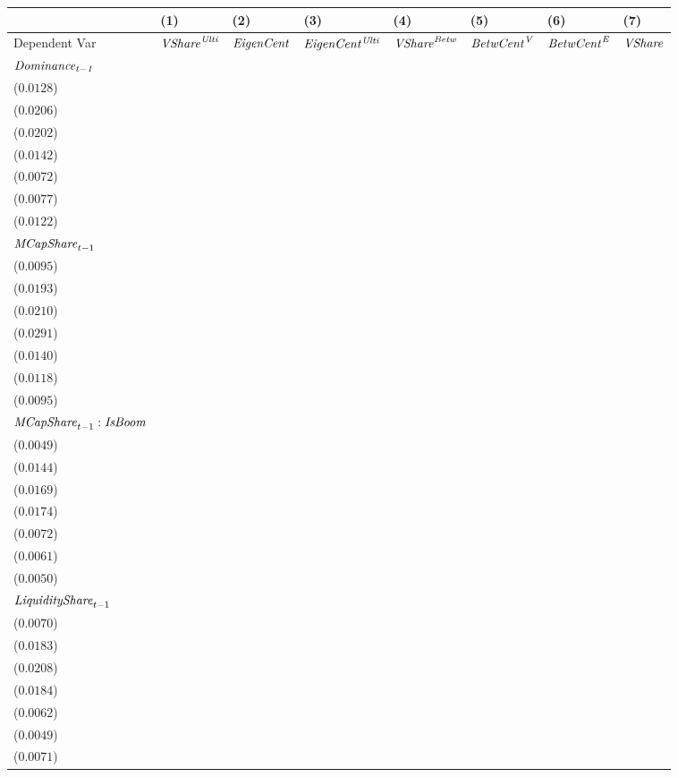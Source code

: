 \begin{tabular}{llllllll}
\toprule
 & (1) & (2) & (3) & (4) & (5) & (6) & (7) \\
\midrule
Dependent Var & ${\it {VShare}^{\it Ulti}}$ & ${\it EigenCent}$ & ${\it EigenCent^{\it Ulti}}$ & ${\it VShare}^{\it Betw}$ & ${\it BetwCent}^{\it V}$ & ${\it BetwCent}^{\it E}$ & ${\it VShare}$ \\
$\it Dominance_{t-1}$ & \makecell{$0.8679^{***}$ \\ ($0.0128$)} & \makecell{$0.8242^{***}$ \\ ($0.0206$)} & \makecell{$0.8127^{***}$ \\ ($0.0202$)} & \makecell{$0.8594^{***}$ \\ ($0.0142$)} & \makecell{$0.9440^{***}$ \\ ($0.0072$)} & \makecell{$0.9456^{***}$ \\ ($0.0077$)} & \makecell{$0.8638^{***}$ \\ ($0.0122$)} \\
${\it MCapShare}_{t-1}$ & \makecell{$0.0128^{}$ \\ ($0.0095$)} & \makecell{$-0.0268^{}$ \\ ($0.0193$)} & \makecell{$-0.0084^{}$ \\ ($0.0210$)} & \makecell{$0.0044^{}$ \\ ($0.0291$)} & \makecell{$0.0296^{**}$ \\ ($0.0140$)} & \makecell{$0.0331^{***}$ \\ ($0.0118$)} & \makecell{$0.0084^{}$ \\ ($0.0095$)} \\
${\it MCapShare}_{t-1}:{\it IsBoom}$ & \makecell{$-0.0031^{}$ \\ ($0.0049$)} & \makecell{$-0.0237^{}$ \\ ($0.0144$)} & \makecell{$-0.0338^{**}$ \\ ($0.0169$)} & \makecell{$0.0650^{***}$ \\ ($0.0174$)} & \makecell{$0.0208^{***}$ \\ ($0.0072$)} & \makecell{$0.0103^{*}$ \\ ($0.0061$)} & \makecell{$0.0044^{}$ \\ ($0.0050$)} \\
${\it LiquidityShare}_{t-1}$ & \makecell{$0.0421^{***}$ \\ ($0.0070$)} & \makecell{$0.0680^{***}$ \\ ($0.0183$)} & \makecell{$0.0748^{***}$ \\ ($0.0208$)} & \makecell{$0.1181^{***}$ \\ ($0.0184$)} & \makecell{$0.0199^{***}$ \\ ($0.0062$)} & \makecell{$0.0173^{***}$ \\ ($0.0049$)} & \makecell{$0.0484^{***}$ \\ ($0.0071$)} \\

\end{tabular}
